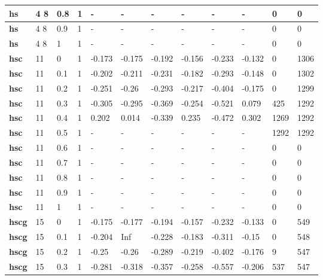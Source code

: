 \begin{table}[h]
\begin{tabular}[h]{|l|l|l|l|l|l|l|l|l|l|l|l|
    }
    \\ \hline
  \textbf{hs  } & 4 8        & 0.8 & 1 & - & - & - & - & - & - &    0 &    0
    \\ \hline
  \textbf{hs  } & 4 8        & 0.9 & 1 & - & - & - & - & - & - &    0 &    0
    \\ \hline
  \textbf{hs  } & 4 8        &   1 & 1 & - & - & - & - & - & - &    0 &    0
    \\ \hline
  \textbf{hsc } & 11         &   0 & 1 & -0.173 & -0.175 & -0.192 & -0.156 & -0.233 & -0.132 &    0 & 1306
    \\ \hline
  \textbf{hsc } & 11         & 0.1 & 1 & -0.202 & -0.211 & -0.231 & -0.182 & -0.293 & -0.148 &    0 & 1302
    \\ \hline
  \textbf{hsc } & 11         & 0.2 & 1 & -0.251 &  -0.26 & -0.293 & -0.217 & -0.404 & -0.175 &    0 & 1299
    \\ \hline
  \textbf{hsc } & 11         & 0.3 & 1 & -0.305 & -0.295 & -0.369 & -0.254 & -0.521 &  0.079 &  425 & 1292
    \\ \hline
  \textbf{hsc } & 11         & 0.4 & 1 &  0.202 &  0.014 & -0.339 &  0.235 & -0.472 &  0.302 & 1269 & 1292
    \\ \hline
  \textbf{hsc } & 11         & 0.5 & 1 & - & - & - & - & - & - & 1292 & 1292
    \\ \hline
  \textbf{hsc } & 11         & 0.6 & 1 & - & - & - & - & - & - &    0 &    0
    \\ \hline
  \textbf{hsc } & 11         & 0.7 & 1 & - & - & - & - & - & - &    0 &    0
    \\ \hline
  \textbf{hsc } & 11         & 0.8 & 1 & - & - & - & - & - & - &    0 &    0
    \\ \hline
  \textbf{hsc } & 11         & 0.9 & 1 & - & - & - & - & - & - &    0 &    0
    \\ \hline
  \textbf{hsc } & 11         &   1 & 1 & - & - & - & - & - & - &    0 &    0
    \\ \hline
  \textbf{hscg} & 15         &   0 & 1 & -0.175 & -0.177 & -0.194 & -0.157 & -0.232 & -0.133 &    0 &  549
    \\ \hline
  \textbf{hscg} & 15         & 0.1 & 1 & -0.204 &    Inf & -0.228 & -0.183 & -0.311 &  -0.15 &    0 &  548
    \\ \hline
  \textbf{hscg} & 15         & 0.2 & 1 &  -0.25 &  -0.26 & -0.289 & -0.219 & -0.402 & -0.176 &    9 &  547
    \\ \hline
  \textbf{hscg} & 15         & 0.3 & 1 & -0.281 & -0.318 & -0.357 & -0.258 & -0.557 & -0.206 &  537 &  547

\end{tabular}
\end{table}
